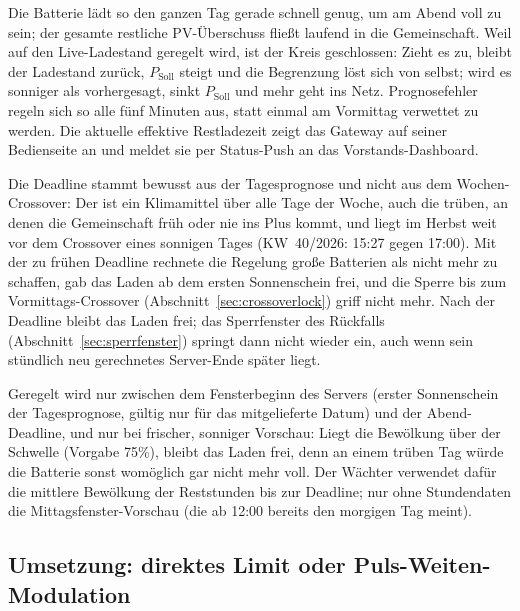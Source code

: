 \documentclass[11pt,a4paper]{article}
\begin{document}
Die Batterie lädt so den ganzen Tag gerade schnell genug, um am Abend voll
zu sein; der gesamte restliche PV-Überschuss fließt laufend in die
Gemeinschaft. Weil auf den Live-Ladestand geregelt wird, ist der Kreis
geschlossen: Zieht es zu, bleibt der Ladestand zurück, $P_{\text{Soll}}$
steigt und die Begrenzung löst sich von selbst; wird es sonniger als
vorhergesagt, sinkt $P_{\text{Soll}}$ und mehr geht ins Netz.
Prognosefehler regeln sich so alle fünf Minuten aus, statt einmal am
Vormittag verwettet zu werden. Die aktuelle effektive Restladezeit zeigt
das Gateway auf seiner Bedienseite an und meldet sie per Status-Push an
das Vorstands-Dashboard.

Die Deadline stammt bewusst aus der Tagesprognose und nicht aus dem
Wochen-Crossover: Der ist ein Klimamittel über alle Tage der Woche, auch die
trüben, an denen die Gemeinschaft früh oder nie ins Plus kommt, und liegt im
Herbst weit vor dem Crossover eines sonnigen Tages (KW~40/2026: 15:27 gegen
17:00). Mit der zu frühen Deadline rechnete die Regelung große Batterien als
nicht mehr zu schaffen, gab das Laden ab dem ersten Sonnenschein frei, und
die Sperre bis zum Vormittags-Crossover
(Abschnitt~\ref{sec:crossoverlock}) griff nicht mehr. Nach der Deadline
bleibt das Laden frei; das Sperrfenster des Rückfalls
(Abschnitt~\ref{sec:sperrfenster}) springt dann nicht wieder ein, auch wenn
sein stündlich neu gerechnetes Server-Ende später liegt.

Geregelt wird nur zwischen dem Fensterbeginn des Servers (erster
Sonnenschein der Tagesprognose, gültig nur für das mitgelieferte Datum) und
der Abend-Deadline, und nur bei frischer, sonniger Vorschau: Liegt die
Bewölkung über der Schwelle (Vorgabe 75\%), bleibt das Laden frei, denn an
einem trüben Tag würde die Batterie sonst womöglich gar nicht mehr voll.
Der Wächter verwendet dafür die mittlere Bewölkung der Reststunden bis zur
Deadline; nur ohne Stundendaten die Mittagsfenster-Vorschau (die ab 12:00
bereits den morgigen Tag meint).

\subsection{Umsetzung: direktes Limit oder Puls-Weiten-Modulation}
\end{document}
